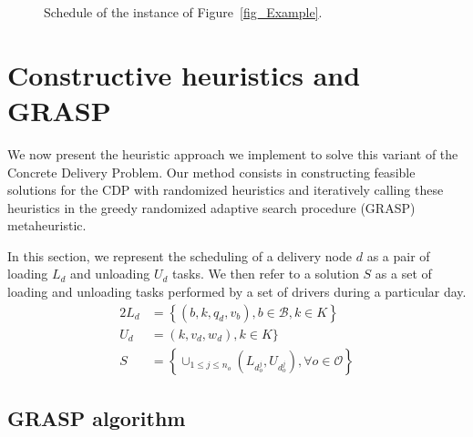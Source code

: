 \documentclass{article}
\begin{document}
\begin{figure}[!htb]
\begin{adjustbox}{max width=0.85\textwidth}
    \end{adjustbox}
    \caption{Schedule of the instance of Figure~\ref{fig_Example}.}
    \label{fig:ganttExample}
\end{figure}


\section{Constructive heuristics and GRASP}
\label{method}

We now present the heuristic approach we implement to solve this variant of the Concrete Delivery Problem. Our method consists in constructing feasible solutions for the CDP with randomized heuristics and iteratively calling these heuristics in the greedy randomized adaptive search procedure (GRASP) metaheuristic.

In this section, we represent the scheduling of a delivery node $d$ as a pair of loading $L_{d}$ and unloading $U_{d}$ tasks. We then refer to a solution $S$ as a set of loading and unloading tasks performed by a set of drivers during a particular day.
\begin{alignat*}{2}
    L_{d} &= \left\lbrace (b,k,q_d,v_b), b \in \mathcal{B}, k \in K \right\rbrace \\
    U_{d} & =  (k,v_d, w_d), k \in K  \} \\
    S &=\left\lbrace \cup _{1 \leq j \leq n_o}  (L_{d^j_{o}},U_{d^j_{o}}), \forall o \in \mathcal{O} \right\rbrace
\end{alignat*}
 

\subsection{GRASP algorithm  }
\end{document}
